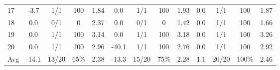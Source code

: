 \begin{table}[p]
{\begin{tabular}{l|cccc|cccc|cccc}
17 & -3.7 & 1/1 & 100 & 1.84 & 0.0 & 1/1 & 100 & 1.93 & 0.0 & 1/1 & 100 & 1.87 \\
18 & 0.0 & 0/1 & 0 & 2.37 & 0.0 & 0/1 & 0 & 1.42 & 0.0 & 1/1 & 100 & 1.66 \\
19 & 0.0 & 1/1 & 100 & 3.14 & 0.0 & 1/1 & 100 & 3.18 & 0.0 & 1/1 & 100 & 3.26 \\
20 & 0.0 & 1/1 & 100 & 2.96 & -40.1 & 1/1 & 100 & 2.76 & 0.0 & 1/1 & 100 & 2.92 \\
\midrule
Avg & -14.1 & 13/20 & 65\% & 2.38 & -13.3 & 15/20 & 75\% & 2.28 & 1.1 & 20/20 & 100\% & 2.46 \\
\bottomrule
\end{tabular}%
}
\end{table}
